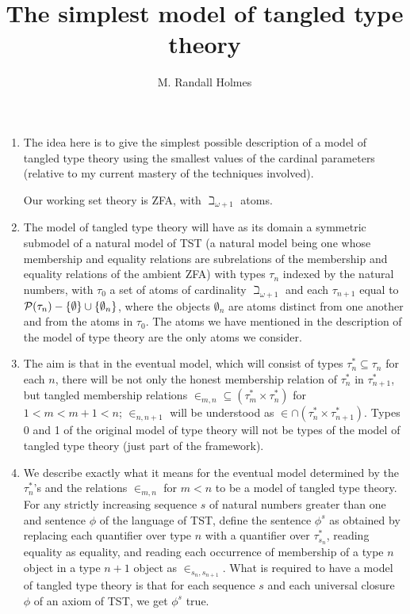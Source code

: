 \documentclass[12pt]{article}
\title{The simplest model of tangled type theory}
\author{M. Randall Holmes}
\begin{document}
\maketitle

\begin{enumerate}

\item The idea here is to give the simplest possible description of a model of tangled type theory using the smallest values of the cardinal parameters (relative to my current mastery of the techniques involved).

Our working set theory is ZFA, with $\beth_{\omega+1}$ atoms.

\item The model of tangled type theory will have as its domain a symmetric submodel of a natural model of TST (a natural model being one whose membership and equality relations are subrelations of the membership and equality relations of the ambient ZFA) with types $\tau_n$ indexed by the natural numbers, with $\tau_0$ a set of atoms
of cardinality $\beth_{\omega+1}$ and each $\tau_{n+1}$ equal to ${\cal P}(\tau_n) - \{\emptyset\} \cup \{\emptyset_n\}$, where the objects $\emptyset_n$ are atoms distinct from one another and from the atoms in $\tau_0$.  The atoms we have mentioned in the description of the model of type theory  are the only atoms we consider.

\item The aim is that in the eventual model, which will consist of types $\tau_n^* \subseteq \tau_n$ for each $n$, there will be not only the honest membership relation of $\tau^*_n$ in $\tau^*_{n+1}$, but tangled membership relations $\in_{m,n} \subseteq (\tau^*_m \times \tau^*_n)$ for $1<m<m+1<n$; $\in_{n,n+1}$ will be understood as $\in \cap (\tau^*_n \times \tau^*_{n+1})$.
Types 0 and 1 of the original model of type theory will not be types of the model of tangled type theory (just part of the framework).

\item  We describe exactly what it means for the eventual model determined by the $\tau^*_n$'s and the relations $\in_{m,n}$ for $m<n$ to be a model of tangled type theory.  For any strictly increasing sequence $s$ of natural numbers greater than one and sentence $\phi$ of the language of TST, define the sentence $\phi^s$ as obtained by replacing
each quantifier over type $n$ with a quantifier over $\tau^*_{s_n}$, reading equality as equality, and reading each occurrence of membership of a type $n$ object in a type $n+1$ object as $\in_{s_n,s_{n+1}}$.  What is required to have a model of tangled type theory is that for each sequence $s$ and each universal closure $\phi$ of an axiom of TST, we get $\phi^s$ true.


\end{enumerate}
\end{document}
